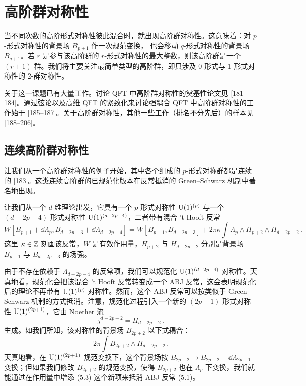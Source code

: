 \section{高阶群对称性}

当不同次数的高阶形式对称性彼此混合时，就出现高阶群对称性。这意味着：对 $p$-形式对称性的背景场 $B_{p+1}$ 作一次规范变换，
也会移动 $q$-形式对称性的背景场 $B_{q+1}$。若 $r$ 是参与该高阶群的 $r$-形式对称性的最大整数，则该高阶群是一个 $(r+1)$-群。我们将主要关注最简单类型的高阶群，即只涉及 0-形式与 1-形式对称性的 2-群对称性。


关于这一课题已有大量工作。讨论 QFT 中高阶群对称性的奠基性论文见 [181--184]。通过弦论以及高维 QFT 的紧致化来讨论强耦合 QFT 中高阶群对称性的工作始于 [185--187]。关于高阶群对称性，其他一些工作（排名不分先后）的样本见 [188--206]。

\subsection{连续高阶群对称性}

让我们从一个高阶群对称性的例子开始，其中各个组成的 $p$-形式对称群都是连续的 [183]。这类连续高阶群的已规范化版本在反常抵消的 Green--Schwarz 机制中著名地出现。

让我们从一个 $d$ 维理论出发，它具有一个 $p$-形式对称性 $\mathrm{U}(1)^{(p)}$ 与一个 $(d-2p-4)$-形式对称性 $\mathrm{U}(1)^{(d-2p-4)}$，二者带有混合 't Hooft 反常
\begin{equation}
  W[B_{p+1}+\dd\Lambda_p,B_{d-2p-3}+\dd\Lambda_{d-2p-4}]
  =W[B_{p+1},B_{d-2p-3}]+2\pi\kappa\int\Lambda_p\wedge H_{p+2}\wedge H_{d-2p-2}\,. \tag{5.1}
\end{equation}
这里 $\kappa\in\mathbb{Z}$ 刻画该反常，$W$ 是有效作用量，$H_{p+2}$ 与 $H_{d-2p-2}$ 分别是背景场 $B_{p+1}$ 与 $B_{d-2p-3}$ 的场强。

由于不存在依赖于 $\Lambda_{d-2p-4}$ 的反常项，我们可以规范化 $\mathrm{U}(1)^{(d-2p-4)}$ 对称性。天真地看，规范化会把该混合 't Hooft 反常转变成一个 ABJ 反常，这会表明规范化后的理论不再带有 $\mathrm{U}(1)^{(p)}$ 对称性。然而，这个 ABJ 反常可以按类似于 Green--Schwarz 机制的方式抵消。注意，规范化过程引入一个新的 $(2p+1)$-形式对称性 $\mathrm{U}(1)^{(2p+1)}$，它由 Noether 流
\begin{equation}
  j^{d-2p-2}=H_{d-2p-2}\,. \tag{5.2}
\end{equation}
生成。如我们所知，该对称性的背景场 $B_{2p+2}$ 以下式耦合：
\begin{equation}
  2\pi\int B_{2p+2}\wedge H_{d-2p-2}\,. \tag{5.3}
\end{equation}
天真地看，在 $\mathrm{U}(1)^{(2p+1)}$ 规范变换下，这个背景场按 $B_{2p+2}\to B_{2p+2}+\dd\Lambda_{2p+1}$ 变换；但如果我们修改 $B_{2p+2}$ 的规范变换，使得 $B_{2p+2}$ 也在 $\Lambda_p$ 下变换，我们就能通过在作用量中增添 (5.3) 这个新项来抵消 ABJ 反常 (5.1)。

